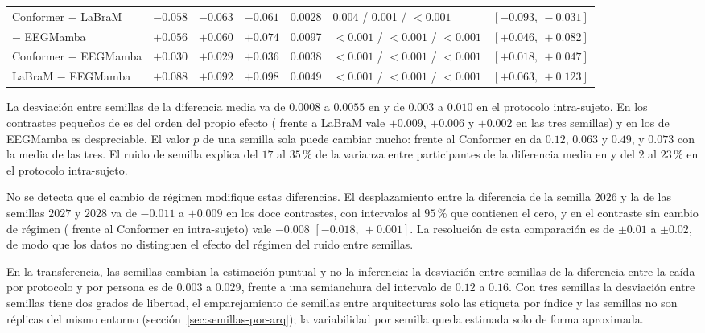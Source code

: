 \begin{table}[H]
{\begin{tabular}{lccccll}
Conformer $-$ LaBraM & $-0.058$ & $-0.063$ & $-0.061$ & 0.0028 & 0.004 / 0.001 / $<0.001$ & $[-0.093,\ -0.031]$ \\
\eegnet{} $-$ EEGMamba & $+0.056$ & $+0.060$ & $+0.074$ & 0.0097 & $<0.001$ / $<0.001$ / $<0.001$ & $[+0.046,\ +0.082]$ \\
Conformer $-$ EEGMamba & $+0.030$ & $+0.029$ & $+0.036$ & 0.0038 & $<0.001$ / $<0.001$ / $<0.001$ & $[+0.018,\ +0.047]$ \\
LaBraM $-$ EEGMamba & $+0.088$ & $+0.092$ & $+0.098$ & 0.0049 & $<0.001$ / $<0.001$ / $<0.001$ & $[+0.063,\ +0.123]$ \\
\bottomrule
\end{tabular}
}
\end{table}

La desviación entre semillas de la diferencia media va de $0.0008$ a $0.0055$ en \loso{} y de $0.003$ a
$0.010$ en el protocolo intra-sujeto. En los contrastes pequeños de \loso{} es del orden del propio
efecto (\eegnet{} frente a LaBraM vale $+0.009$, $+0.006$ y $+0.002$ en las tres semillas) y en los de
EEGMamba es despreciable. El valor $p$ de una semilla sola puede cambiar mucho: \eegnet{} frente al
Conformer en \loso{} da $0.12$, $0.063$ y $0.49$, y $0.073$ con la media de las tres. El ruido de semilla
explica del $17$ al $35$\,\% de la varianza entre participantes de la diferencia media en \loso{} y del
$2$ al $23$\,\% en el protocolo intra-sujeto.

No se detecta que el cambio de régimen modifique estas diferencias. El desplazamiento entre la diferencia
de la semilla $2026$ y la de las semillas $2027$ y $2028$ va de $-0.011$ a $+0.009$ en los doce contrastes,
con intervalos al $95$\,\% que contienen el cero, y en el contraste sin cambio de régimen (\eegnet{}
frente al Conformer en intra-sujeto) vale $-0.008$ $[-0.018,\ +0.001]$. La resolución de esta comparación
es de $\pm 0.01$ a $\pm 0.02$, de modo que los datos no distinguen el efecto del régimen del ruido
entre semillas.

En la transferencia, las semillas cambian la estimación puntual y no la inferencia: la desviación entre
semillas de la diferencia entre la caída por protocolo y por persona es de $0.003$ a $0.029$, frente a
una semianchura del intervalo de $0.12$ a $0.16$. Con tres semillas la desviación entre semillas tiene
dos grados de libertad, el emparejamiento de semillas entre arquitecturas solo las etiqueta por índice y
las semillas no son réplicas del mismo entorno (sección~\ref{sec:semillas-por-arq}); la variabilidad por
semilla queda estimada solo de forma aproximada.

